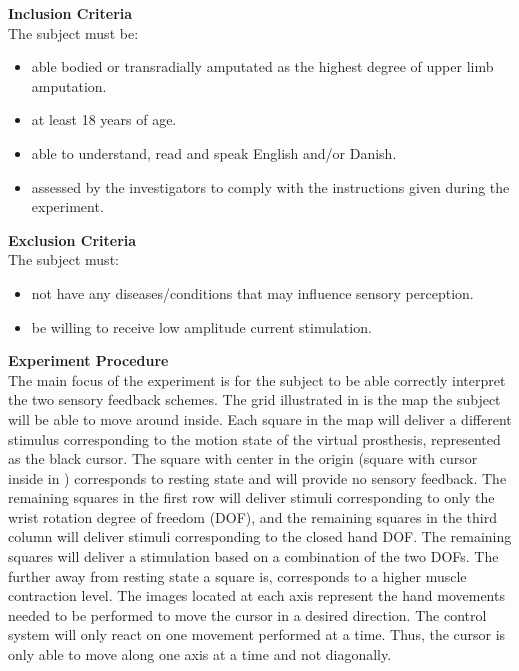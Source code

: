 \textbf{Inclusion Criteria} \\
The subject must be:
\begin{itemize}
	\item able bodied or transradially amputated as the highest degree of upper limb amputation.
	\item at least 18 years of age.
	\item able to understand, read and speak English and/or Danish.
	\item assessed by the investigators to comply with the instructions given during the experiment.
\end{itemize}

\textbf{Exclusion Criteria} \\
The subject must:
\begin{itemize}
	\item not have any diseases/conditions that may influence sensory perception.
	\item be willing to receive low amplitude current stimulation. 
\end{itemize}

\textbf{{\Large Experiment Procedure}} \\
\newline
The main focus of the experiment is for the subject to be able correctly interpret the two sensory feedback schemes. The grid illustrated in  is the map the subject will be able to move around inside. Each square in the map will deliver a different stimulus corresponding to the motion state of the virtual prosthesis, represented as the black cursor. The square with center in the origin (square with cursor inside in ) corresponds to resting state and will provide no sensory feedback. The remaining squares in the first row will deliver stimuli corresponding to only the wrist rotation degree of freedom (DOF), and the remaining squares in the third column will deliver stimuli corresponding to the closed hand DOF. The remaining squares will deliver a stimulation based on a combination of the two DOFs. The further away from resting state a square is, corresponds to a higher muscle contraction level.
The images located at each axis represent the hand movements needed to be performed to move the cursor in a desired direction. The control system will only react on one movement performed at a time. Thus, the cursor is only able to move along one axis at a time and not diagonally.

